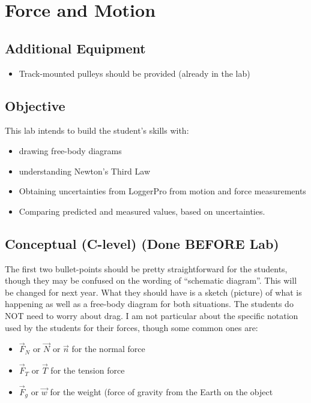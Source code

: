 \documentclass[fleqn,letterpaper]{article}
\begin{document}
\cfoot{}
\headsep=25pt

\section*{Force and Motion}

\subsection*{Additional Equipment}

\begin{itemize}
  \item{Track-mounted pulleys should be provided (already in the lab)}
\end{itemize}

\subsection*{Objective}

This lab intends to build the student's skills with:
%
\begin{itemize}
 \item{drawing free-body diagrams}
 \item{understanding Newton's Third Law}
 \item{Obtaining uncertainties from LoggerPro from motion and force measurements}
 \item{Comparing predicted and measured values, based on uncertainties.}
\end{itemize}
%

\subsection*{Conceptual (C-level) (Done BEFORE Lab)}

The first two bullet-points should be pretty straightforward for the students, though they may be confused on the wording of ``schematic diagram''.  This will be changed for next year.  What they should have is a sketch (picture) of what is happening as well as a free-body diagram for both situations.  The students do NOT need to worry about drag.  I am not particular about the specific notation used by the students for their forces, though some common ones are:

\begin{itemize}
 \item{$\vec{F}_N$ or $\vec{N}$ or $\vec{n}$ for the normal force}
 \item{$\vec{F}_T$ or $\vec{T}$ for the tension force}
 \item{$\vec{F}_g$ or $\vec{w}$ for the weight (force of gravity from the Earth on the object}
\end{itemize}
\end{document}
